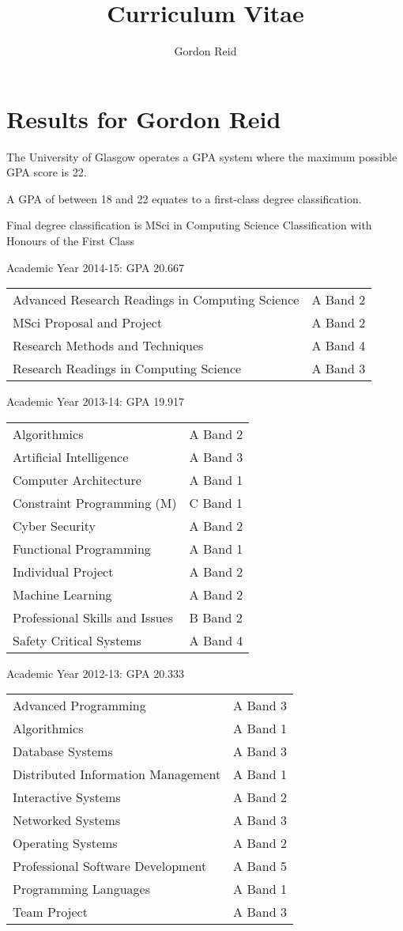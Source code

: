 \documentclass[10pt,a4paper]{article}
\title{Curriculum Vitae}
\author{Gordon Reid}
\begin{document}
\section*{Results for Gordon Reid}
The University of Glasgow operates a GPA system where the maximum possible GPA
score is 22.

A GPA of between 18 and 22 equates to a first-class degree classification.

Final degree classification is MSci in Computing Science Classification with
Honours of the First Class

Academic Year 2014-15: GPA 20.667

\begin{tabular}{p{10cm}l}
    Advanced Research Readings in Computing Science & A Band 2\\
    MSci Proposal and Project & A Band 2\\
    Research Methods and Techniques & A Band 4\\
    Research Readings in Computing Science & A Band 3\\
\end{tabular}

Academic Year 2013-14: GPA 19.917

\begin{tabular}{p{10cm}l}
    Algorithmics & A Band 2\\
    Artificial Intelligence & A Band 3\\
    Computer Architecture & A Band 1\\
    Constraint Programming (M) & C Band 1\\
    Cyber Security & A Band 2\\
    Functional Programming & A Band 1\\
    Individual Project & A Band 2\\
    Machine Learning & A Band 2\\
    Professional Skills and Issues & B Band 2\\
    Safety Critical Systems & A Band 4\\
\end{tabular}

Academic Year 2012-13: GPA 20.333

\begin{tabular}{p{10cm}l}
    Advanced Programming & A Band 3\\
    Algorithmics & A Band 1\\
    Database Systems & A Band 3\\
    Distributed Information Management & A Band 1\\
    Interactive Systems & A Band 2\\
    Networked Systems & A Band 3\\
    Operating Systems & A Band 2\\
    Professional Software Development & A Band 5\\
    Programming Languages & A Band 1\\
    Team Project & A Band 3\\
\end{tabular}
\end{document}

